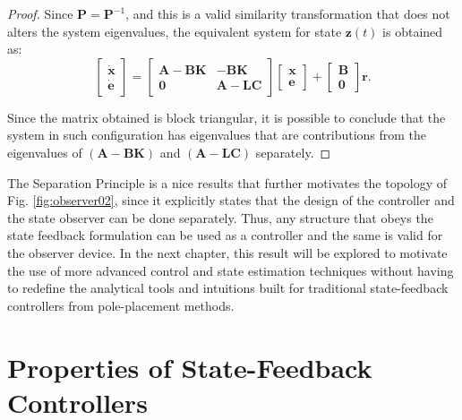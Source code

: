 \documentclass[a4paper,11pt]{book}
\numberwithin{figure}{chapter}
\numberwithin{equation}{chapter}
\numberwithin{table}{chapter}
\theoremstyle{definition}
\begin{document}
\begin{proof}
Since $\bm{P} = \bm{P}^{-1}$, and this is a valid similarity transformation that does not alters the system eigenvalues, the equivalent system for state $\bm{z}(t)$ is obtained as:
\begin{equation}
    \begin{bmatrix} \dot{\bm{x}} \\ \dot{\bm{e}}    \end{bmatrix}
    =
    \begin{bmatrix}
        \bm{A} - \bm{B} \bm{K} & - \bm{B} \bm{K} \\
        \bm{0} & \bm{A} - \bm{L} \bm{C}
    \end{bmatrix} \begin{bmatrix} \bm{x} \\ \bm{e} \end{bmatrix}
    +
    \begin{bmatrix} \bm{B} \\ \bm{0} \end{bmatrix} \bm{r}
.\end{equation} \vskip0.2cm

Since the matrix obtained is block triangular, it is possible to conclude that the system in such configuration has eigenvalues that are contributions from the eigenvalues of $\left( \bm{A} - \bm{B} \bm{K} \right)$ and $\left( \bm{A} - \bm{L} \bm{C} \right)$ separately.
\end{proof}

The Separation Principle is a nice results that further motivates the topology of Fig. \ref{fig:observer02}, since it explicitly states that the design of the controller and the state observer can be done separately. Thus, any structure that obeys the state feedback formulation can be used as a controller and the same is valid for the observer device. In the next chapter, this result will be explored to motivate the use of more advanced control and state estimation techniques without having to redefine the analytical tools and intuitions built for traditional state-feedback controllers from pole-placement methods.

\section{Properties of State-Feedback Controllers}
\end{document}
